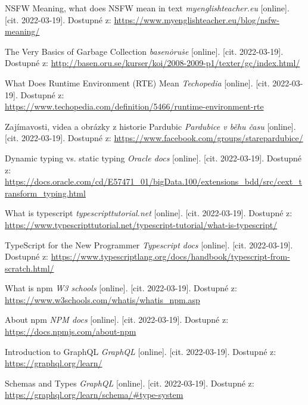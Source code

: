 \begin{thebibliography}{100}

     NSFW Meaning, what does NSFW mean in text \textit{myenglishteacher.eu} [online]. [cit. 2022-03-19]. Dostupné z: \url{https://www.myenglishteacher.eu/blog/nsfw-meaning/}
    
     The Very Basics of Garbage Collection \textit{basen\.oru\.se} [online]. [cit. 2022-03-19]. Dostupné z: \url{http://basen.oru.se/kurser/koi/2008-2009-p1/texter/gc/index.html/}
    
     What Does Runtime Environment (RTE) Mean \textit{Techopedia} [online]. [cit. 2022-03-19]. Dostupné z: \\ \url{https://www.techopedia.com/definition/5466/runtime-environment-rte}
    
     Zajímavosti, videa a obrázky z historie Pardubic \textit{Pardubice v běhu času} [online]. [cit. 2022-03-19]. Dostupné z: \url{https://www.facebook.com/groups/starepardubice/}
    
     Dynamic typing vs. static typing \textit{Oracle docs} [online]. [cit. 2022-03-19]. Dostupné z: \\ \url{https://docs.oracle.com/cd/E57471_01/bigData.100/extensions_bdd/src/cext_transform_typing.html}
    
     What is typescript \textit{typescripttutorial.net} [online]. [cit. 2022-03-19]. Dostupné z: \url{https://www.typescripttutorial.net/typescript-tutorial/what-is-typescript/}
    
     TypeScript for the New Programmer \textit{Typescript docs} [online]. [cit. 2022-03-19]. Dostupné z: \url{https://www.typescriptlang.org/docs/handbook/typescript-from-scratch.html/}
    
     What is npm \textit{W3 schools} [online]. [cit. 2022-03-19]. Dostupné z: \url{https://www.w3schools.com/whatis/whatis_npm.asp}
    
     About npm \textit{NPM docs} [online]. [cit. 2022-03-19]. Dostupné z: \url{https://docs.npmjs.com/about-npm}
    
     Introduction to GraphQL \textit{GraphQL} [online]. [cit. 2022-03-19]. Dostupné z: \url{https://graphql.org/learn/}
    
     Schemas and Types \textit{GraphQL} [online]. [cit. 2022-03-19]. Dostupné z: \url{https://graphql.org/learn/schema/#type-system}
    

\end{thebibliography}
